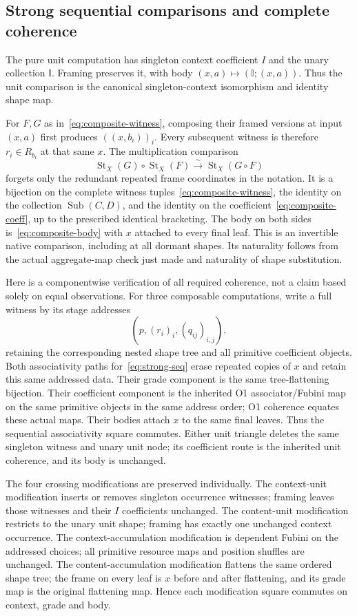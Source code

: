 \documentclass[11pt,a4paper]{article}
\theoremstyle{definition}
\newcommand{\st}{\operatorname{St}}
\newcommand{\Sub}{\operatorname{Sub}}
\begin{document}
\subsection{Strong sequential comparisons and complete coherence}
The pure unit computation has singleton context coefficient $I$ and the
unary collection $\mathbb I$. Framing preserves it, with body
$(x,a)\mapsto(\mathbb I;(x,a))$. Thus the unit comparison is the canonical
singleton-context isomorphism and identity shape map.

For $F,G$ as in~\eqref{eq:composite-witness}, composing their framed
versions at input $(x,a)$ first produces $((x,b_i))_i$. Every subsequent
witness is therefore $r_i\in R_{b_i}$ at that same $x$. The multiplication
comparison
\begin{equation}\label{eq:strong-seq}
 \st_X(G)\circ\st_X(F)\xrightarrow{\sim}\st_X(G\circ F)
\end{equation}
forgets only the redundant repeated frame coordinates in the notation.
It is a bijection on the complete witness tuples~\eqref{eq:composite-witness},
the identity on the collection $\Sub(C,D)$, and the identity on the
coefficient~\eqref{eq:composite-coeff}, up to the prescribed identical
bracketing. The body on both sides is~\eqref{eq:composite-body} with $x$
attached to every final leaf. This is an invertible native comparison,
including at all dormant shapes. Its naturality follows from the actual
aggregate-map check just made and naturality of shape substitution.

Here is a componentwise verification of all required coherence, not a
claim based solely on equal observations. For three composable computations,
write a full witness by its stage addresses
\[
 (p,(r_i)_i,(q_{ij})_{i,j}),
\]
retaining the corresponding nested shape tree and all primitive coefficient
objects. Both associativity paths for~\eqref{eq:strong-seq} erase repeated
copies of $x$ and retain this same addressed data. Their grade component is
the same tree-flattening bijection. Their coefficient component is the
inherited O1 associator/Fubini map on the same primitive objects in the same
address order; O1 coherence equates these actual maps. Their bodies attach
$x$ to the same final leaves. Thus the sequential associativity square
commutes. Either unit triangle deletes the same singleton witness and unary
unit node; its coefficient route is the inherited unit coherence, and its
body is unchanged.

The four crossing modifications are preserved individually. The context-unit
modification inserts or removes singleton occurrence witnesses; framing leaves
those witnesses and their $I$ coefficients unchanged. The content-unit
modification restricts to the unary unit shape; framing has exactly one
unchanged context occurrence. The context-accumulation modification is
dependent Fubini on the addressed choices; all primitive resource maps and
position shuffles are unchanged. The content-accumulation modification
flattens the same ordered shape tree; the frame on every leaf is $x$ before
and after flattening, and its grade map is the original flattening map.
Hence each modification square commutes on context, grade and body.
\end{document}
